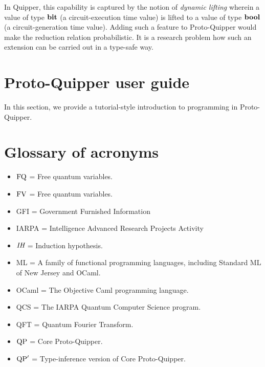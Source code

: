 \documentclass[twoside]{article}
\begin{document}
In Quipper, this capability is captured by the notion of \emph{dynamic
  lifting} wherein a value of type $\textrm{\bf bit}$ (a circuit-execution time
value) is lifted to a value of type $\textrm{\bf bool}$ (a circuit-generation time
value). Adding such a feature to Proto-Quipper would make the
reduction relation probabilistic. It is a research problem how such an
extension can be carried out in a type-safe way. 

\clearpage
\section{Proto-Quipper user guide}
\label{sec-user-guide}

In this section, we provide a tutorial-style introduction to 
programming in Proto-Quipper. 



\clearpage
\section*{Glossary of acronyms}

\begin{itemize}
  \item $\mathop{\textrm{FQ}}\nolimits$ = Free quantum variables.
  \item $\mathop{\textrm{FV}}\nolimits$ = Free quantum variables.
  \item GFI = Government Furnished Information
  \item IARPA = Intelligence Advanced Research Projects Activity
  \item $\textit{IH}$ = Induction hypothesis.
  \item ML = A family of functional programming languages, including
    Standard ML of New Jersey and OCaml.
  \item OCaml = The Objective Caml programming language.
  \item QCS = The IARPA Quantum Computer Science program.
  \item QFT = Quantum Fourier Transform.
  \item ${\rm QP}$ = Core Proto-Quipper.
  \item ${\rm QP}'$ = Type-inference version of Core Proto-Quipper.
\end{itemize}

\clearpage

{}

\end{document}
